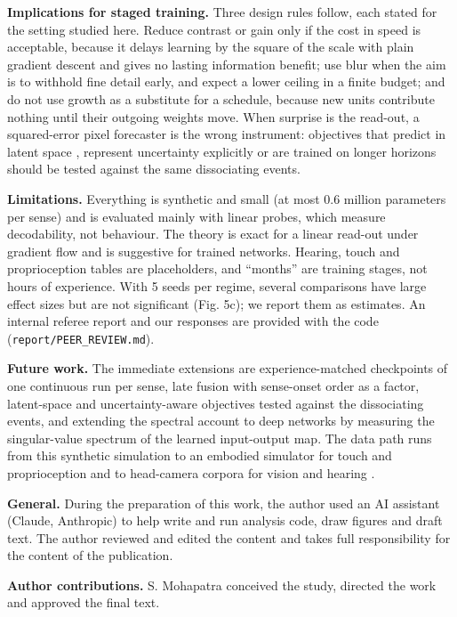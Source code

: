 \documentclass{article}
\begin{document}
\textbf{Implications for staged training.} Three design rules follow, each stated for the setting studied here. Reduce contrast or gain only if the cost in speed is acceptable, because it delays learning by the square of the scale with plain gradient descent and gives no lasting information benefit; use blur when the aim is to withhold fine detail early, and expect a lower ceiling in a finite budget; and do not use growth as a substitute for a schedule, because new units contribute nothing until their outgoing weights move. When surprise is the read-out, a squared-error pixel forecaster is the wrong instrument: objectives that predict in latent space \autocite{garrido2025intuitive}, represent uncertainty explicitly or are trained on longer horizons should be tested against the same dissociating events.

\textbf{Limitations.} Everything is synthetic and small (at most 0.6 million parameters per sense) and is evaluated mainly with linear probes, which measure decodability, not behaviour. The theory is exact for a linear read-out under gradient flow and is suggestive for trained networks. Hearing, touch and proprioception tables are placeholders, and ``months'' are training stages, not hours of experience. With 5 seeds per regime, several comparisons have large effect sizes but are not significant (Fig. 5c); we report them as estimates. An internal referee report and our responses are provided with the code (\texttt{report/PEER\_REVIEW.md}).

\textbf{Future work.} The immediate extensions are experience-matched checkpoints of one continuous run per sense, late fusion with sense-onset order as a factor, latent-space and uncertainty-aware objectives tested against the dissociating events, and extending the spectral account to deep networks by measuring the singular-value spectrum of the learned input-output map. The data path runs from this synthetic simulation to an embodied simulator for touch and proprioception \autocite{mattern2024mimo} and to head-camera corpora for vision and hearing \autocite{sullivan2021saycam,long2024babyview}.


\textbf{General.} During the preparation of this work, the author used an AI assistant (Claude, Anthropic) to help write and run analysis code, draw figures and draft text. The author reviewed and edited the content and takes full responsibility for the content of the publication.

\textbf{Author contributions.} S. Mohapatra conceived the study, directed the work and approved the final text.
\end{document}
